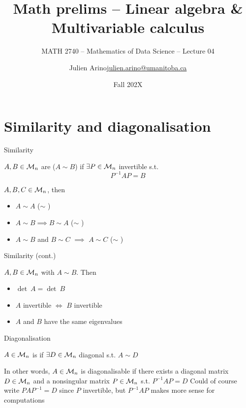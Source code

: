 \documentclass[aspectratio=169]{beamer}\usepackage[]{graphicx}\usepackage[]{xcolor}
\subtitle{MATH 2740 -- Mathematics of Data Science -- Lecture 04}
\author{\texorpdfstring{Julien Arino\newline\url{julien.arino@umanitoba.ca}}{Julien Arino}}
\institute{Department of Mathematics @ University of Manitoba}
\date{Fall 202X}
\title{Math prelims -- Linear algebra \& Multivariable calculus}
\begin{document}

\section{Similarity and diagonalisation}

\begin{frame}{Similarity}
\begin{definition}[Similarity]
$A,B\in\mathcal{M}_n$ are  ($A\sim B$) if $\exists P\in\mathcal{M}_n$ invertible s.t.
\[
P^{-1}AP=B
\]
\end{definition}
\begin{theorem}
$A,B,C\in\mathcal{M}_n$, then
\begin{itemize}
	\item $A\sim A$ \hfill ($\sim$ )
	\item $A\sim B\implies B\sim A$ \hfill ($\sim$ )
	\item $A\sim B$ and $B\sim C$ $\implies$ $A\sim C$ \hfill ($\sim$ )
\end{itemize}
\end{theorem}
\end{frame}

\begin{frame}{Similarity (cont.)}
\begin{theorem}
$A,B\in\mathcal{M}_n$ with $A\sim B$. Then
\begin{itemize}
	\item $\det\ A=\det\ B$
	\item $A$ invertible $\iff$ $B$ invertible
	\item $A$ and $B$ have the same eigenvalues
\end{itemize}
\end{theorem}
\end{frame}


\begin{frame}{Diagonalisation}
\begin{definition}[Diagonalisability]
$A\in\mathcal{M}_n$ is  if $\exists D\in\mathcal{M}_n$ diagonal s.t. $A\sim D$
\end{definition}
\vfill
In other words, $A\in\mathcal{M}_n$ is diagonalisable if there exists a diagonal matrix $D\in\mathcal{M}_n$ and a nonsingular matrix $P\in\mathcal{M}_n$ s.t. $P^{-1}AP=D$
\vfill
Could of course write $PAP^{-1}=D$ since $P$ invertible, but $P^{-1}AP$ makes more sense for computations
\end{frame}
\end{document}
